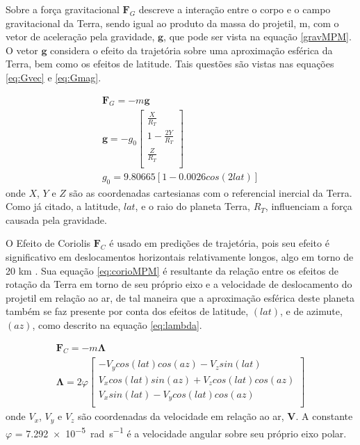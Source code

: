 Sobre a força gravitacional \(\boldsymbol{F}_{G}\) descreve a interação entre o corpo e o campo gravitacional da Terra, sendo igual ao produto da massa do projetil, m, com o vetor de aceleração pela gravidade, \(\boldsymbol{g}\), que pode ser vista na equação \ref{gravMPM}. O vetor \(\boldsymbol{g}\) considera o efeito da trajetória sobre uma aproximação esférica da Terra, bem como os efeitos de latitude. Tais questões são vistas nas equações \ref{eq:Gvec} e \ref{eq:Gmag}.

\begin{gather}
    \label{gravMPM}
    \boldsymbol{F}_{G} = -m\boldsymbol{g} \\
    \label{eq:Gvec}
    \boldsymbol{g} = -g_{0}\begin{bmatrix} 
        \frac{X}{R_{T}} \\
        1 - \frac{2Y}{R_{T}}\\
        \frac{Z}{R_{T}} \\
    \end{bmatrix} \\
    \label{eq:Gmag}
    g_{0} = \num{9,80665}[1 - \num{0,0026}cos(2lat)] 
\end{gather}
%
onde \(X\), \(Y\) e \(Z\) são as coordenadas cartesianas com o referencial inercial da Terra. Como já citado, a latitude, \(lat\), e o raio do planeta Terra, \(R_{T}\), influenciam a força causada pela gravidade.

O Efeito de Coriolis \(\boldsymbol{F}_{C}\) é usado em predições de trajetória, pois seu efeito é significativo em deslocamentos horizontais relativamente longos, algo em torno de 20 km \cite{McCoy2012}. Sua equação \ref{eq:corioMPM} é resultante da relação entre os efeitos de rotação da Terra em torno de seu próprio eixo e a velocidade de deslocamento do projetil em relação ao ar, de tal maneira que a aproximação esférica deste planeta também se faz presente por conta dos efeitos de latitude, \(\left(lat\right)\), e de azimute, \(\left(az\right)\), como descrito na equação \ref{eq:lambda}.

\begin{gather}
\label{eq:corioMPM}
\boldsymbol{F}_{C} = -m\boldsymbol{\Lambda} \\
\label{eq:lambda}
\boldsymbol{\Lambda} = 2\varphi
\begin{bmatrix} 
    -V_{y}cos(lat)cos(az) - V_{z}sin(lat) \\
    V_{x}cos(lat)sin(az) + V_{z}cos(lat)cos(az)\\
    V_{x}sin(lat) - V_{y}cos(lat)cos(az) \\
\end{bmatrix}
\end{gather}
%
onde \(V_{x}\), \(V_{y}\) e \(V_{z}\) são coordenadas da velocidade em relação ao ar, \(\boldsymbol{V}\). A constante \(\varphi\) = \qty{7,292e-5}{\radian\per\second} é a velocidade angular sobre seu próprio eixo polar.

